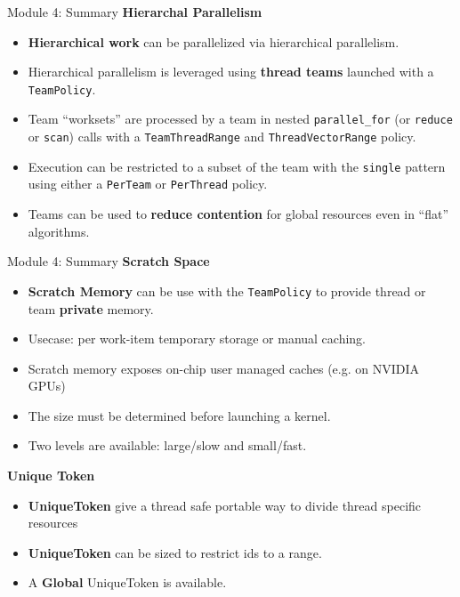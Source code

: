 



\begin{frame}[fragile]{Module 4: Summary}
	\textbf{Hierarchal Parallelism}
  \begin{itemize}
    \item{\textbf{Hierarchical work} can be parallelized via hierarchical parallelism.}
    \item{Hierarchical parallelism is leveraged using \textbf{thread teams} launched with a \texttt{TeamPolicy}.}
    \item{Team ``worksets'' are processed by a team in nested \texttt{parallel\_for} (or \texttt{reduce} or \texttt{scan}) calls with a \texttt{TeamThreadRange} and \texttt{ThreadVectorRange} policy.}
    \item{Execution can be restricted to a subset of the team with the \texttt{single} pattern using either a \texttt{PerTeam} or \texttt{PerThread} policy.}
    \item{Teams can be used to \textbf{reduce contention} for global resources even in ``flat'' algorithms.}
  \end{itemize}


  
\end{frame}

\begin{frame}[fragile]{Module 4: Summary}
   \textbf{Scratch Space}
\begin{itemize}
    \item{\textbf{Scratch Memory} can be use with the \texttt{TeamPolicy} to provide thread or team \textbf{private} memory.}
    \item{Usecase: per work-item temporary storage or manual caching.}
    \item{Scratch memory exposes on-chip user managed caches (e.g. on NVIDIA GPUs)}
    \item{The size must be determined before launching a kernel.}
    \item{Two levels are available: large/slow and small/fast.}
  \end{itemize}
  \textbf{Unique Token}
  \begin{itemize}
    \item{\textbf{UniqueToken} give a thread safe portable way to divide thread specific resources}
    \item{\textbf{UniqueToken} can be sized to restrict ids to a range.}
    \item{A \textbf{Global} UniqueToken is available.}
  \end{itemize}

\end{frame}

